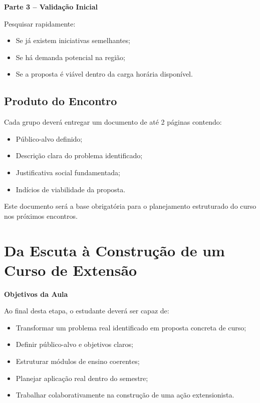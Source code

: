 \documentclass[12pt,a4paper]{article}
\begin{document}
\textbf{Parte 3 – Validação Inicial}

Pesquisar rapidamente:

\begin{itemize}
    \item Se já existem iniciativas semelhantes;
    \item Se há demanda potencial na região;
    \item Se a proposta é viável dentro da carga horária disponível.
\end{itemize}

\subsection*{Produto do Encontro}

Cada grupo deverá entregar um documento de até 2 páginas contendo:

\begin{itemize}
    \item Público-alvo definido;
    \item Descrição clara do problema identificado;
    \item Justificativa social fundamentada;
    \item Indícios de viabilidade da proposta.
\end{itemize}

Este documento será a base obrigatória para o planejamento estruturado do curso nos próximos encontros.








\newpage


\section{Da Escuta à Construção de um Curso de Extensão}

\begin{boxObjetivos}
\textbf{Objetivos da Aula}

Ao final desta etapa, o estudante deverá ser capaz de:

\begin{itemize}
    \item Transformar um problema real identificado em proposta concreta de curso;
    \item Definir público-alvo e objetivos claros;
    \item Estruturar módulos de ensino coerentes;
    \item Planejar aplicação real dentro do semestre;
    \item Trabalhar colaborativamente na construção de uma ação extensionista.
\end{itemize}
\end{boxObjetivos}
\end{document}
